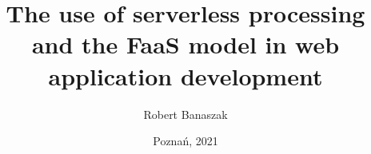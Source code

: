 \documentclass[11pt,a4paper,thesis,english]{dcsbook}
\begin{document}
\author{Robert Banaszak}
\title{The use of serverless processing and the FaaS model in web application development}
\date{Poznań, 2021}
\maketitle
\frontmatter


\tableofcontents{}
\mainmatter







\backmatter

{\raggedright\sloppy\small}
\end{document}
